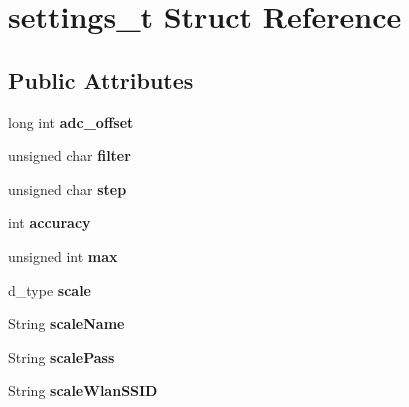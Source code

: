 \hypertarget{structsettings__t}{\section{settings\-\_\-t Struct Reference}
\label{structsettings__t}
}
\subsection*{Public Attributes}
\begin{DoxyCompactItemize}
\item 
\hypertarget{structsettings__t_ac345690e54d462fa8d3e6e9d9c640bef}{long int {\bfseries adc\-\_\-offset}}\label{structsettings__t_ac345690e54d462fa8d3e6e9d9c640bef}

\item 
\hypertarget{structsettings__t_aaf6ab74547e8a6d75faba3820e6b45ae}{unsigned char {\bfseries filter}}\label{structsettings__t_aaf6ab74547e8a6d75faba3820e6b45ae}

\item 
\hypertarget{structsettings__t_a39d7d91157025b052e2278b98650f5fa}{unsigned char {\bfseries step}}\label{structsettings__t_a39d7d91157025b052e2278b98650f5fa}

\item 
\hypertarget{structsettings__t_a3f30ad7e9d060aad1f04c84caa4b58df}{int {\bfseries accuracy}}\label{structsettings__t_a3f30ad7e9d060aad1f04c84caa4b58df}

\item 
\hypertarget{structsettings__t_a050d9fa1f1b298adb277c35e9416de0f}{unsigned int {\bfseries max}}\label{structsettings__t_a050d9fa1f1b298adb277c35e9416de0f}

\item 
\hypertarget{structsettings__t_a71592efa6e60f31de145bbb9028742e4}{d\-\_\-type {\bfseries scale}}\label{structsettings__t_a71592efa6e60f31de145bbb9028742e4}

\item 
\hypertarget{structsettings__t_a83e16f6c347e2b7ddb202b80f482d8e0}{String {\bfseries scale\-Name}}\label{structsettings__t_a83e16f6c347e2b7ddb202b80f482d8e0}

\item 
\hypertarget{structsettings__t_a0a5bd02dfadfa75bbb3466f93d649bb6}{String {\bfseries scale\-Pass}}\label{structsettings__t_a0a5bd02dfadfa75bbb3466f93d649bb6}

\item 
\hypertarget{structsettings__t_ad582f4c16696c387fabc54408dc5fb5b}{String {\bfseries scale\-Wlan\-S\-S\-I\-D}}\label{structsettings__t_ad582f4c16696c387fabc54408dc5fb5b}


\end{DoxyCompactItemize}
